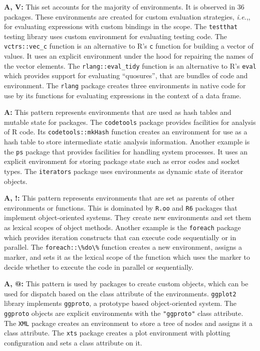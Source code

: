 \documentclass[10pt,review,sigplan,anonymous=true,authorversion=true,nonacm=true]{acmart}
\newcommand{\code}[1]{\lstinline |#1|\xspace}
\newcommand{\ie}{\emph{i.e.},\xspace}
\begin{document}
\noindent
\textbf{A, V:} This set accounts for the majority of environments. It is
observed in 36 packages. These environments are created for custom evaluation
strategies, \ie, for evaluating expressions with custom bindings in the scope.
The \code{testthat} testing library uses custom environment for evaluating
testing code. The \code{vctrs::vec_c} function is an alternative to R's \code{c}
function for building a vector of values. It uses an explicit environment under
the hood for repairing the names of the vector elements. The
\code{rlang::eval_tidy} function is an alternative to R's \code{eval} which
provides support for evaluating ``quosures'', that are bundles of code and
environment. The \code{rlang} package creates three environments in native code
for use by its functions for evaluating expressions in the context of a data
frame.

\noindent
\textbf{A:} This pattern represents environments that are used as hash tables
and mutable state for packages. The \code{codetools} package provides facilities
for analysis of R code. Its \code{codetools::mkHash} function creates an
environment for use as a hash table to store intermediate static analysis
information. Another example is the \code{ps} package that provides facilities
for handling system processes. It uses an explicit environment for storing
package state such as error codes and socket types. The \code{iterators} package
uses environments as dynamic state of iterator objects.

\noindent
\textbf{A, !:} This pattern represents environments that are set as parents of
other environments or functions. This is dominated by \code{R.oo} and \code{R6}
packages that implement object-oriented systems. They create new environments
and set them as lexical scopes of object methods. Another example is the
\code{foreach} package which provides iteration constructs that can execute code
sequentially or in parallel. The \code{foreach::\%do\%} function creates a new
environment, assigns a marker, and sets it as the lexical scope of the function
which uses the marker to decide whether to execute the code in parallel or
sequentially.

\noindent
\textbf{A, @:} This pattern is used by packages to create custom objects, which
can be used for dispatch based on the class attribute of the environments.
\code{ggplot2} library implements \code{ggproto}, a prototype based
object-oriented system. The \code{ggproto} objects are explicit environments
with the \code{"ggproto"} class attribute. The \code{XML} package creates an
environment to store a tree of nodes and assigns it a class attribute. The
\code{xts} package creates a plot environment with plotting configuration and
sets a class attribute on it.
\end{document}
